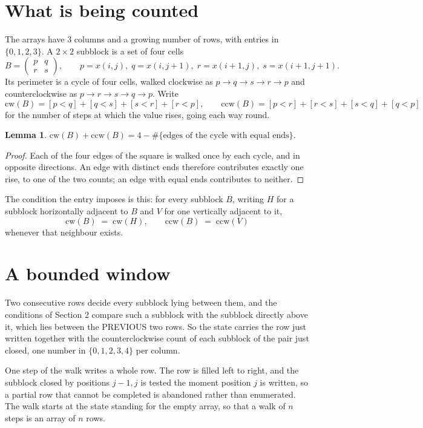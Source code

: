 \documentclass[11pt,a4paper]{article}
\theoremstyle{plain}
\newtheorem{lemma}[theorem]{Lemma}
\theoremstyle{definition}
\begin{document}
\section{What is being counted}

The arrays have $3$ columns and a growing number of rows, with entries in $\{0,1,2,3\}$. A
$2\times2$ subblock is a set of four cells
\[
B=\begin{pmatrix} p & q \\ r & s \end{pmatrix},
\qquad p=x(i,j),\; q=x(i,j+1),\; r=x(i+1,j),\; s=x(i+1,j+1).
\]
Its perimeter is a cycle of four cells, walked clockwise as $p\to q\to s\to r\to p$ and
counterclockwise as $p\to r\to s\to q\to p$. Write
\[
\mathrm{cw}(B)=[p<q]+[q<s]+[s<r]+[r<p],\qquad
\mathrm{ccw}(B)=[p<r]+[r<s]+[s<q]+[q<p]
\]
for the number of steps at which the value rises, going each way round.

\begin{lemma}\label{lem:sum}
$\mathrm{cw}(B)+\mathrm{ccw}(B)=4-\#\{\text{edges of the cycle with equal ends}\}$.
\end{lemma}

\begin{proof}
Each of the four edges of the square is walked once by each cycle, and in opposite directions.
An edge with distinct ends therefore contributes exactly one rise, to one of the two counts;
an edge with equal ends contributes to neither.
\end{proof}

The condition the entry imposes is this: for every subblock $B$, writing $H$ for a subblock horizontally adjacent to $B$ and $V$ for one vertically adjacent to it,
\[
\mathrm{cw}(B)\;=\;\mathrm{cw}(H),\qquad \mathrm{ccw}(B)\;=\;\mathrm{ccw}(V)
\]
whenever that neighbour exists.

\section{A bounded window}

Two consecutive rows decide every subblock lying between them, and the conditions of Section 2 compare such a subblock with the subblock directly above it, which lies between the PREVIOUS two rows. So the state carries the row just written together with the counterclockwise count of each subblock of the pair just closed, one number in $\{0,1,2,3,4\}$ per column.

One step of the walk writes a whole row. The row is filled left to right, and the subblock
closed by positions $j-1,j$ is tested the moment position $j$ is written, so a partial row that
cannot be completed is abandoned rather than enumerated. The walk starts at the state standing
for the empty array, so that a walk of $n$ steps is an array of $n$ rows.
\end{document}
